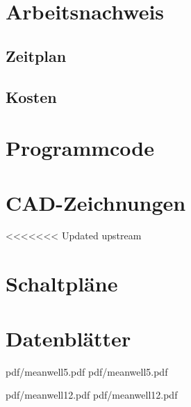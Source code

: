 \appendix
\chapter{Arbeitsnachweis}

\section{Zeitplan}

\section{Kosten}

\chapter{Programmcode}

\chapter{CAD-Zeichnungen}

<<<<<<< Updated upstream
\chapter{Schaltpläne}

\chapter{Datenblätter}

 {pdf/meanwell5.pdf}
 {pdf/meanwell5.pdf}


 {pdf/meanwell12.pdf}
 {pdf/meanwell12.pdf}

